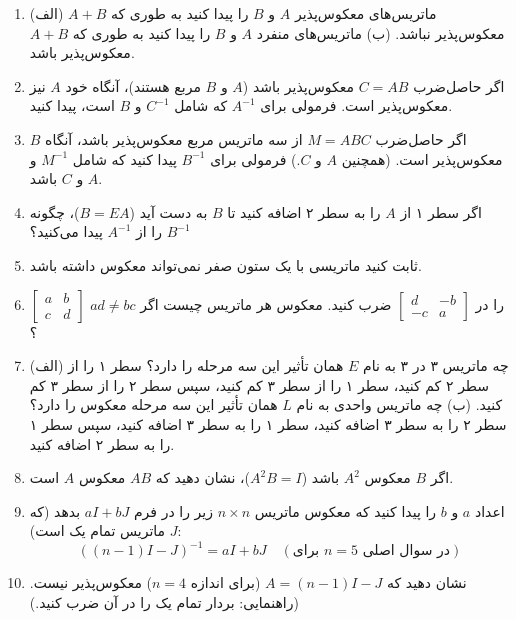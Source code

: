 \documentclass[12pt, a4paper]{book}
\begin{document}
\begin{enumerate}
		\item (الف) ماتریس‌های معکوس‌پذیر $A$ و $B$ را پیدا کنید به طوری که $A+B$ معکوس‌پذیر نباشد.
		(ب) ماتریس‌های منفرد $A$ و $B$ را پیدا کنید به طوری که $A+B$ معکوس‌پذیر باشد.
		
		\item اگر حاصل‌ضرب $C=AB$ معکوس‌پذیر باشد ($A$ و $B$ مربع هستند)، آنگاه خود $A$ نیز معکوس‌پذیر است. فرمولی برای $A^{-1}$ که شامل $C^{-1}$ و $B$ است، پیدا کنید.
		
		\item اگر حاصل‌ضرب $M=ABC$ از سه ماتریس مربع معکوس‌پذیر باشد، آنگاه $B$ معکوس‌پذیر است. (همچنین $A$ و $C$.) فرمولی برای $B^{-1}$ پیدا کنید که شامل $M^{-1}$ و $A$ و $C$ باشد.
		
		\item اگر سطر ۱ از $A$ را به سطر ۲ اضافه کنید تا $B$ به دست آید ($B=EA$)، چگونه $B^{-1}$ را از $A^{-1}$ پیدا می‌کنید؟
		
		\item ثابت کنید ماتریسی با یک ستون صفر نمی‌تواند معکوس داشته باشد.
		
		\item $\begin{bmatrix} a & b \\ c & d \end{bmatrix}$ را در $\begin{bmatrix} d & -b \\ -c & a \end{bmatrix}$ ضرب کنید. معکوس هر ماتریس چیست اگر $ad \neq bc$؟
		
		\item (الف) چه ماتریس ۳ در ۳ به نام $E$ همان تأثیر این سه مرحله را دارد؟ سطر ۱ را از سطر ۲ کم کنید، سطر ۱ را از سطر ۳ کم کنید، سپس سطر ۲ را از سطر ۳ کم کنید.
		(ب) چه ماتریس واحدی به نام $L$ همان تأثیر این سه مرحله معکوس را دارد؟ سطر ۲ را به سطر ۳ اضافه کنید، سطر ۱ را به سطر ۳ اضافه کنید، سپس سطر ۱ را به سطر ۲ اضافه کنید.
		
		\item اگر $B$ معکوس $A^2$ باشد ($A^2B=I$)، نشان دهید که $AB$ معکوس $A$ است.
		
		\item اعداد $a$ و $b$ را پیدا کنید که معکوس ماتریس $n \times n$ زیر را در فرم $aI+bJ$ بدهد (که $J$ ماتریس تمام یک است):
		\[ ( (n-1)I - J )^{-1} = aI + bJ \quad (\text{برای } n=5 \text{ در سوال اصلی}) \]
		
		\item نشان دهید که $A= (n-1)I - J$ (برای اندازه $n=4$) معکوس‌پذیر نیست. (راهنمایی: بردار تمام یک را در آن ضرب کنید.)
		

\end{enumerate}
\end{document}
